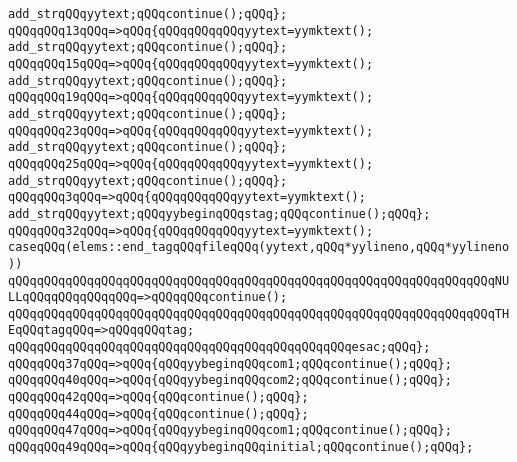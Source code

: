 \verb|add_strqQQqyytext;qQQqcontinue();qQQq};|\newline
\verb|qQQqqQQq13qQQq=>qQQq{qQQqqQQqqQQqyytext=yymktext();|\newline
\verb|add_strqQQqyytext;qQQqcontinue();qQQq};|\newline
\verb|qQQqqQQq15qQQq=>qQQq{qQQqqQQqqQQqyytext=yymktext();|\newline
\verb|add_strqQQqyytext;qQQqcontinue();qQQq};|\newline
\verb|qQQqqQQq19qQQq=>qQQq{qQQqqQQqqQQqyytext=yymktext();|\newline
\verb|add_strqQQqyytext;qQQqcontinue();qQQq};|\newline
\verb|qQQqqQQq23qQQq=>qQQq{qQQqqQQqqQQqyytext=yymktext();|\newline
\verb|add_strqQQqyytext;qQQqcontinue();qQQq};|\newline
\verb|qQQqqQQq25qQQq=>qQQq{qQQqqQQqqQQqyytext=yymktext();|\newline
\verb|add_strqQQqyytext;qQQqcontinue();qQQq};|\newline
\verb|qQQqqQQq3qQQq=>qQQq{qQQqqQQqqQQqyytext=yymktext();|\newline
\verb|add_strqQQqyytext;qQQqyybeginqQQqstag;qQQqcontinue();qQQq};|\newline
\verb|qQQqqQQq32qQQq=>qQQq{qQQqqQQqqQQqyytext=yymktext();|\newline
\verb|caseqQQq(elems::end_tagqQQqfileqQQq(yytext,qQQq*yylineno,qQQq*yylineno))|\newline
\verb|qQQqqQQqqQQqqQQqqQQqqQQqqQQqqQQqqQQqqQQqqQQqqQQqqQQqqQQqqQQqqQQqqQQqNULLqQQqqQQqqQQqqQQq=>qQQqqQQqcontinue();|\newline
\verb|qQQqqQQqqQQqqQQqqQQqqQQqqQQqqQQqqQQqqQQqqQQqqQQqqQQqqQQqqQQqqQQqqQQqTHEqQQqtagqQQq=>qQQqqQQqtag;|\newline
\verb|qQQqqQQqqQQqqQQqqQQqqQQqqQQqqQQqqQQqqQQqqQQqqQQqesac;qQQq};|\newline
\verb|qQQqqQQq37qQQq=>qQQq{qQQqyybeginqQQqcom1;qQQqcontinue();qQQq};|\newline
\verb|qQQqqQQq40qQQq=>qQQq{qQQqyybeginqQQqcom2;qQQqcontinue();qQQq};|\newline
\verb|qQQqqQQq42qQQq=>qQQq{qQQqcontinue();qQQq};|\newline
\verb|qQQqqQQq44qQQq=>qQQq{qQQqcontinue();qQQq};|\newline
\verb|qQQqqQQq47qQQq=>qQQq{qQQqyybeginqQQqcom1;qQQqcontinue();qQQq};|\newline
\verb|qQQqqQQq49qQQq=>qQQq{qQQqyybeginqQQqinitial;qQQqcontinue();qQQq};|\newline
